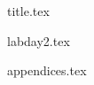 \documentclass[final]{scrartcl} %
\begin{document}

{title.tex}

\newpage

\tableofcontents

\newpage
{}
{labday2.tex}
\newpage
{}

\printbibliography
{appendices.tex}
\end{document}
